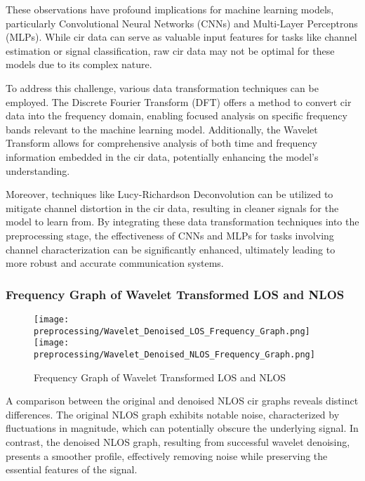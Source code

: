These observations have profound implications for machine learning models, particularly Convolutional Neural Networks (CNNs) and Multi-Layer Perceptrons (MLPs). While \acrshort{cir} data can serve as valuable input features for tasks like channel estimation or signal classification, raw \acrshort{cir} data may not be optimal for these models due to its complex nature.

To address this challenge, various data transformation techniques can be employed. The Discrete Fourier Transform (DFT) offers a method to convert \acrshort{cir} data into the frequency domain, enabling focused analysis on specific frequency bands relevant to the machine learning model. Additionally, the Wavelet Transform allows for comprehensive analysis of both time and frequency information embedded in the \acrshort{cir} data, potentially enhancing the model's understanding.

Moreover, techniques like Lucy-Richardson Deconvolution can be utilized to mitigate channel distortion in the \acrshort{cir} data, resulting in cleaner signals for the model to learn from. By integrating these data transformation techniques into the preprocessing stage, the effectiveness of CNNs and MLPs for tasks involving channel characterization can be significantly enhanced, ultimately leading to more robust and accurate communication systems.



\subsubsection{Frequency Graph of Wavelet Transformed LOS and NLOS}\label{frequency_graph_wavelet}

\begin{figure}[H] 
  \centering
  \texttt{[image: preprocessing/Wavelet\_Denoised\_LOS\_Frequency\_Graph.png]}
  \texttt{[image: preprocessing/Wavelet\_Denoised\_NLOS\_Frequency\_Graph.png]}
  \caption{Frequency Graph of Wavelet Transformed LOS and NLOS}\label{fig:frequency_graph_wavelet}
\end{figure}

A comparison between the original and denoised NLOS \acrshort{cir} graphs reveals distinct differences. The original NLOS graph exhibits notable noise, characterized by fluctuations in magnitude, which can potentially obscure the underlying signal. In contrast, the denoised NLOS graph, resulting from successful wavelet denoising, presents a smoother profile, effectively removing noise while preserving the essential features of the signal.

